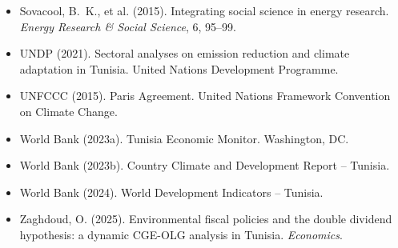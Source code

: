 \documentclass[12pt, a4paper]{article}
\begin{document}
\begin{itemize}[label={}, leftmargin=2em, itemindent=-2em, itemsep=2pt]
\item Sovacool, B.~K., et al. (2015). Integrating social science in energy research. \textit{Energy Research \& Social Science}, 6, 95--99.

\item UNDP (2021). Sectoral analyses on emission reduction and climate adaptation in Tunisia. United Nations Development Programme.

\item UNFCCC (2015). Paris Agreement. United Nations Framework Convention on Climate Change.

\item World Bank (2023a). Tunisia Economic Monitor. Washington, DC.

\item World Bank (2023b). Country Climate and Development Report -- Tunisia.

\item World Bank (2024). World Development Indicators -- Tunisia.

\item Zaghdoud, O. (2025). Environmental fiscal policies and the double dividend hypothesis: a dynamic CGE-OLG analysis in Tunisia. \textit{Economics}.

\end{itemize}
\end{document}
